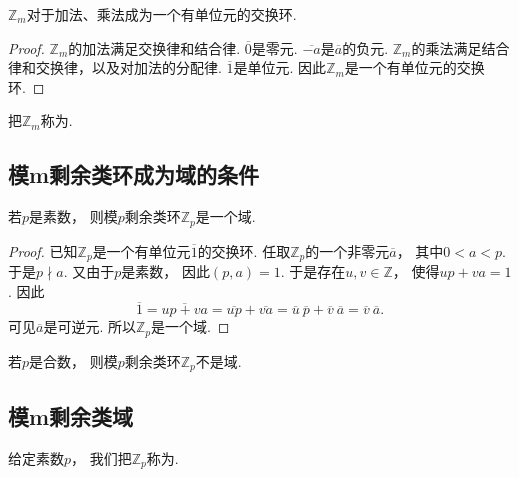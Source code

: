 \begin{proposition}\label{theorem:剩余类环.整数集对模m同余关系的商集对加法和乘法成环}
\(\mathbb{Z}_m\)对于加法、乘法成为一个有单位元的交换环.
\begin{proof}
\(\mathbb{Z}_m\)的加法满足交换律和结合律.
\(\overline{0}\)是零元.
\(\overline{-a}\)是\(\overline{a}\)的负元.
\(\mathbb{Z}_m\)的乘法满足结合律和交换律，以及对加法的分配律.
\(\overline{1}\)是单位元.
因此\(\mathbb{Z}_m\)是一个有单位元的交换环.
\end{proof}
\end{proposition}

\begin{definition}
把\(\mathbb{Z}_m\)称为.
\end{definition}

\subsection{模m剩余类环成为域的条件}
\begin{theorem}
若\(p\)是素数，
则模\(p\)剩余类环\(\mathbb{Z}_p\)是一个域.
\begin{proof}
已知\(\mathbb{Z}_p\)是一个有单位元\(\overline1\)的交换环.
任取\(\mathbb{Z}_p\)的一个非零元\(\overline{a}\)，
其中\(0<a<p\).
于是\(p \nmid a\).
又由于\(p\)是素数，
因此\((p,a)=1\).
于是存在\(u,v\in\mathbb{Z}\)，
使得\(up+va=1\).
因此\begin{equation*}
	\overline1
	=\overline{up+va}
	=\overline{up}
	+\overline{va}
	=\overline{u}~\overline{p}
	+\overline{v}~\overline{a}
	=\overline{v}~\overline{a}.
\end{equation*}
可见\(\overline{a}\)是可逆元.
所以\(\mathbb{Z}_p\)是一个域.
\end{proof}
\end{theorem}

\begin{theorem}
若\(p\)是合数，
则模\(p\)剩余类环\(\mathbb{Z}_p\)不是域.
\end{theorem}

\subsection{模m剩余类域}
\begin{definition}
给定素数\(p\)，
我们把\(\mathbb{Z}_p\)称为.
\end{definition}

